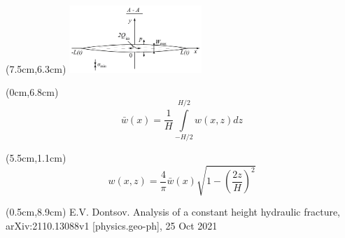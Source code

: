 \documentclass{beamer}
\begin{document}
\begin{frame}
\begin{textblock*}{7cm}(7.5cm,6.3cm)
\includegraphics[width=5cm]{pkn_model_A-A_plane.jpg}
\end{textblock*}

\begin{textblock*}{3.7cm}(0cm,6.8cm)
\tiny
$$
\boxed{
\bar{w}(x)=\frac{1}{H}\!\int\limits_{-H/2}^{H/2}{w(x,z)dz}
}
$$
\end{textblock*}

\begin{textblock*}{7cm}(5.5cm,1.1cm)
\tiny
$$
\boxed{
w(x,z)=\frac{4}{\pi}\bar{w}(x)\sqrt{1-\left(\frac{2z}{H}\right)^2}
}
$$
\end{textblock*}

\begin{textblock*}{6cm}(0.5cm,8.9cm)
\tiny
\textcolor{lit_gray}{E.V. Dontsov. Analysis of a constant height hydraulic fracture, arXiv:2110.13088v1 [physics.geo-ph], 25 Oct 2021}
\end{textblock*}

\normalsize

\end{frame}
\end{document}
